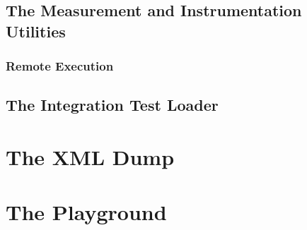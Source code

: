 \subsection{The Measurement and Instrumentation Utilities}
\subsubsection{Remote Execution}
\subsection{The Integration Test Loader}

\section{The XML Dump}
\section{The Playground}
